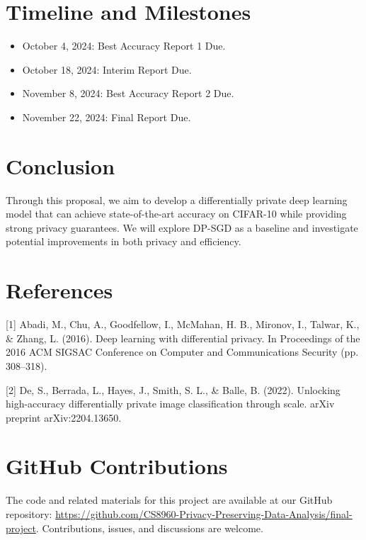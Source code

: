 \documentclass{article}
\begin{document}
\section{Timeline and Milestones}
\begin{itemize}
    \item October 4, 2024: Best Accuracy Report 1 Due.
    \item October 18, 2024: Interim Report Due.
    \item November 8, 2024: Best Accuracy Report 2 Due.
    \item November 22, 2024: Final Report Due.
\end{itemize}


    \section{Conclusion}\label{sec:conclusion}
    Through this proposal, we aim to develop a differentially private deep learning model that can achieve
    state-of-the-art accuracy on CIFAR-10 while providing strong privacy guarantees.
    We will explore DP-SGD as a baseline and investigate potential improvements in both privacy and efficiency.

    \section*{References}
    \small{
        [1] Abadi, M., Chu, A., Goodfellow, I., McMahan, H. B., Mironov, I., Talwar, K., \& Zhang, L. (2016). Deep learning with differential privacy. In Proceedings of the 2016 ACM SIGSAC Conference on Computer and Communications Security (pp. 308–318).

        [2] De, S., Berrada, L., Hayes, J., Smith, S. L., \& Balle, B. (2022). Unlocking high-accuracy differentially private image classification through scale. arXiv preprint arXiv:2204.13650.
    }

\section*{GitHub Contributions}
The code and related materials for this project are available at our GitHub repository: \url{https://github.com/CS8960-Privacy-Preserving-Data-Analysis/final-project}. Contributions, issues, and discussions are welcome.
\end{document}
